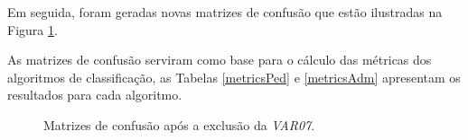 Em seguida, foram geradas novas matrizes de confusão que estão ilustradas na Figura \ref{newConfusionMatrixResult}.

As matrizes de confusão serviram como base para o cálculo das métricas dos
algoritmos de classificação, as Tabelas \ref{metricsPed} e \ref{metricsAdm}
apresentam os resultados para cada algoritmo.

\begin{figure}[!htb]
  \centering
  \caption{\label{newConfusionMatrixResult} Matrizes de confusão após a exclusão da \textit{VAR07}.}
  \qquad
  \qquad

\end{figure}

